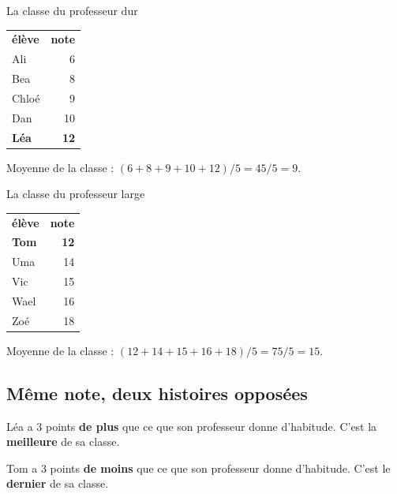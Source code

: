 \begin{tcbraster}[raster columns=2, raster equal height, raster column skip=8pt, raster every box/.style={unbreakable}]
\begin{bloc}[sectioncolor]{\faUserTie\quad La classe du professeur dur}
\begin{center}
\renewcommand{\arraystretch}{1.2}
\begin{tabular}{lr}
\textbf{élève} & \textbf{note} \\
Ali & 6 \\
Bea & 8 \\
Chloé & 9 \\
Dan & 10 \\
\textbf{Léa} & \textbf{12} \\
\end{tabular}
\end{center}
Moyenne de la classe : $(6 + 8 + 9 + 10 + 12) / 5 = 45 / 5 = 9$.
\end{bloc}
\begin{bloc}[accentblue]{\faUserGraduate\quad La classe du professeur large}
\begin{center}
\renewcommand{\arraystretch}{1.2}
\begin{tabular}{lr}
\textbf{élève} & \textbf{note} \\
\textbf{Tom} & \textbf{12} \\
Uma & 14 \\
Vic & 15 \\
Wael & 16 \\
Zoé & 18 \\
\end{tabular}
\end{center}
Moyenne de la classe : $(12 + 14 + 15 + 16 + 18) / 5 = 75 / 5 = 15$.
\end{bloc}
\end{tcbraster}

\subsection{Même note, deux histoires opposées}

\begin{tcbraster}[raster columns=2, raster equal height, raster column skip=8pt, raster every box/.style={unbreakable}]
\begin{kpibox}[title={Léa : $12 - 9 = +3$}, unbreakable]
\small Léa a 3 points \textbf{de plus} que ce que son professeur donne d'habitude. C'est la
\textbf{meilleure} de sa classe.
\end{kpibox}
\begin{kpibox}[title={Tom : $12 - 15 = -3$}, unbreakable]
\small Tom a 3 points \textbf{de moins} que ce que son professeur donne d'habitude. C'est le
\textbf{dernier} de sa classe.
\end{kpibox}
\end{tcbraster}

